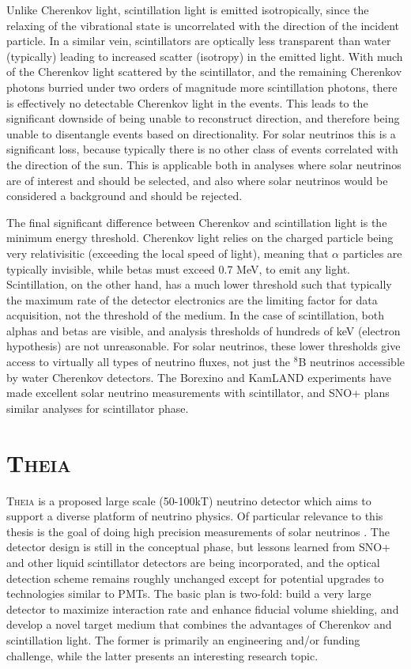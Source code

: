 Unlike Cherenkov light, scintillation light is emitted isotropically, since the relaxing of the vibrational state is uncorrelated with the direction of the incident particle.
In a similar vein, scintillators are optically less transparent than water (typically) leading to increased scatter (isotropy) in the emitted light.
With much of the Cherenkov light scattered by the scintillator, and the remaining Cherenkov photons burried under two orders of magnitude more scintillation photons, there is effectively no detectable Cherenkov light in the events.
This leads to the significant downside of being unable to reconstruct direction, and therefore being unable to disentangle events based on directionality. 
For solar neutrinos this is a significant loss, because typically there is no other class of events correlated with the direction of the sun.
This is applicable both in analyses where solar neutrinos are of interest and should be selected, and also where solar neutrinos would be considered a background and should be rejected.

The final significant difference between Cherenkov and scintillation light is the minimum energy threshold.
Cherenkov light relies on the charged particle being very relativisitic (exceeding the local speed of light), meaning that $\alpha$ particles are typically invisible, while betas must exceed 0.7 MeV, to emit any light.
Scintillation, on the other hand, has a much lower threshold such that typically the maximum rate of the detector electronics are the limiting factor for data acquisition, not the threshold of the medium.
In the case of scintillation, both alphas and betas are visible, and analysis thresholds of hundreds of keV (electron hypothesis) are not unreasonable. 
For solar neutrinos, these lower thresholds give access to virtually all types of neutrino fluxes, not just the $^8$B neutrinos accessible by water Cherenkov detectors.
The Borexino \cite{borexino} and KamLAND \cite{kamland} experiments have made excellent solar neutrino measurements with scintillator, and SNO+ plans similar analyses for scintillator phase.

\section{\textsc{Theia}}

\textsc{Theia} \cite{asdc_paper} is a proposed large scale (50-100kT) neutrino detector which aims to support a diverse platform of neutrino physics. 
Of particular relevance to this thesis is the goal of doing high precision measurements of solar neutrinos \cite{theia_solar}.
The detector design is still in the conceptual phase, but lessons learned from SNO+ and other liquid scintillator detectors are being incorporated, and the optical detection scheme remains roughly unchanged except for potential upgrades to technologies similar to PMTs.
The basic plan is two-fold: build a very large detector to maximize interaction rate and enhance fiducial volume shielding, and develop a novel target medium that combines the advantages of Cherenkov and scintillation light.
The former is primarily an engineering and/or funding challenge, while the latter presents an interesting research topic.

